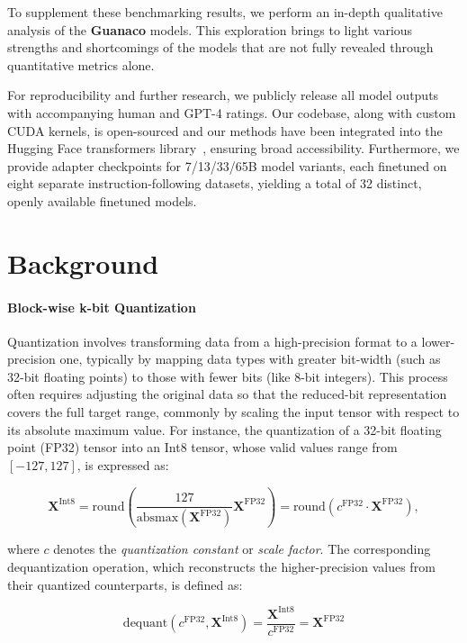 To supplement these benchmarking results, we perform an in-depth qualitative analysis of the \textbf{Guanaco} models. This exploration brings to light various strengths and shortcomings of the models that are not fully revealed through quantitative metrics alone.

For reproducibility and further research, we publicly release all model outputs with accompanying human and GPT-4 ratings. Our codebase, along with custom CUDA kernels, is open-sourced and our methods have been integrated into the Hugging Face transformers library~\citep{wolf2019huggingface}, ensuring broad accessibility. Furthermore, we provide adapter checkpoints for 7/13/33/65B model variants, each finetuned on eight separate instruction-following datasets, yielding a total of 32 distinct, openly available finetuned models.

\section{Background}
\paragraph{Block-wise k-bit Quantization} Quantization involves transforming data from a high-precision format to a lower-precision one, typically by mapping data types with greater bit-width (such as 32-bit floating points) to those with fewer bits (like 8-bit integers). This process often requires adjusting the original data so that the reduced-bit representation covers the full target range, commonly by scaling the input tensor with respect to its absolute maximum value. For instance, the quantization of a 32-bit floating point (FP32) tensor into an Int8 tensor, whose valid values range from $[-127, 127]$, is expressed as:

\begin{equation}
    \mathbf{X}^{ \text{Int8}} = \text{round}\left( \frac{127}{{\text{absmax}}(\mathbf{X}^{{\text{FP32}}})}\mathbf{X}^{{\text{FP32}}} \right) = \text{round}(c^{\text{FP32}}\cdot \mathbf{X}^{{\text{FP32}}}),
\end{equation}

where $c$ denotes the {\em quantization constant} or {\em scale factor}. The corresponding dequantization operation, which reconstructs the higher-precision values from their quantized counterparts, is defined as:

\begin{equation}
    \text{dequant}(c^{\text{FP32}}, \mathbf{X}^{\text{Int8}}) = \frac{\mathbf{X}^{\text{Int8}}}{c^{\text{FP32}}} = \mathbf{X}^{\text{FP32}}
\end{equation}

